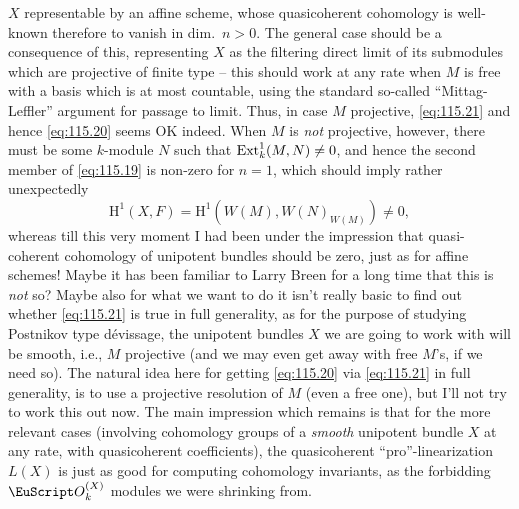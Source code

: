 $X$ representable by an affine scheme, whose quasicoherent cohomology
is well-known therefore to vanish in dim.~$n>0$. The general case
should be a consequence of this, representing $X$ as the filtering
direct limit of its submodules which are projective of finite type --
this should work at any rate when $M$ is free with a basis which is at
most countable, using the standard so-called ``Mittag-Leffler''
argument for passage to limit. Thus, in case $M$ projective,
\eqref{eq:115.21} and hence \eqref{eq:115.20} seems OK indeed. When
$M$ is \emph{not} projective, however, there must be some $k$-module
$N$ such that $\operatorname{Ext}_k^1(M,N)\ne0$, and hence the second member of
\eqref{eq:115.19} is non-zero for $n=1$, which should imply rather
unexpectedly
\[\mathrm H^1(X,F)=\mathrm H^1(W(M),W(N)_{W(M)})\ne0,\]
whereas till this very moment I had been under the impression that
quasi-coherent cohomology of unipotent bundles should be zero, just as
for affine schemes! Maybe it has been familiar to Larry Breen for a
long time that this is \emph{not} so? Maybe also for what we want to
do it isn't really basic to find out whether \eqref{eq:115.21} is true
in full generality, as for the purpose of studying Postnikov type
dévissage, the unipotent bundles $X$ we are going to work
with will be smooth, i.e., $M$ projective (and we may even get away
with free $M$'s, if we need so). The natural idea here for getting
\eqref{eq:115.20} via \eqref{eq:115.21} in full generality, is to use
a projective resolution of $M$ (even a free one), but I'll not try to
work this out now. The main impression which remains is that for the
more relevant cases (involving cohomology groups of a \emph{smooth}
unipotent bundle $X$ at any rate, with quasicoherent coefficients),
the quasicoherent ``pro''-linearization $L(X)$ is just as good for
computing cohomology invariants, as the forbidding $\scrO_k^{(X)}$
modules we were shrinking from.

